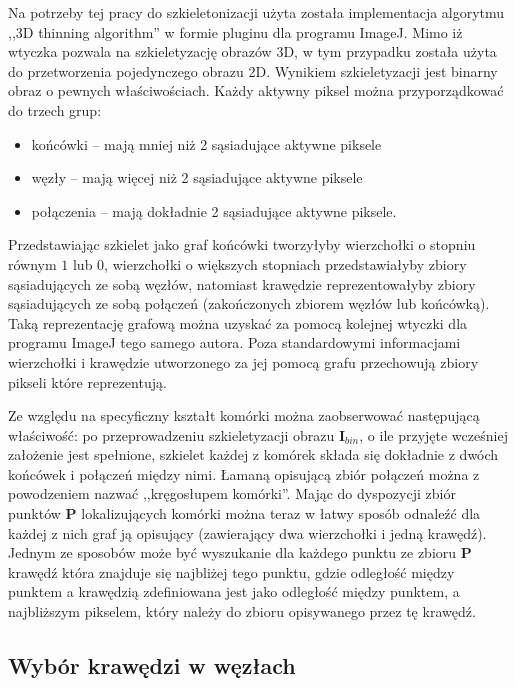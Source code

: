 \documentclass[declaration,shortabstract,mgr]{iithesis}
\newcommand{\image}{\mathbf{I}}
\begin{document}
Na potrzeby tej pracy do szkieletonizacji użyta została implementacja algorytmu ,,3D thinning algorithm''\cite{algo:3d-thinning} w formie pluginu dla programu ImageJ\cite{plugin:skeletonize-3d}. Mimo iż wtyczka pozwala na szkieletyzację obrazów 3D, w tym przypadku została użyta do przetworzenia pojedynczego obrazu 2D. Wynikiem szkieletyzacji jest binarny obraz o pewnych właściwościach. Każdy aktywny piksel można przyporządkować do trzech grup:
\begin{itemize}
  \item końcówki -- mają mniej niż 2 sąsiadujące aktywne piksele
  \item węzły -- mają więcej niż 2 sąsiadujące aktywne piksele
  \item połączenia -- mają dokładnie 2 sąsiadujące aktywne piksele.
\end{itemize}
Przedstawiając szkielet jako graf końcówki tworzyłyby wierzchołki o stopniu równym $1$ lub $0$, wierzchołki o większych stopniach przedstawiałyby zbiory sąsiadujących ze sobą węzłów, natomiast krawędzie reprezentowałyby zbiory sąsiadujących ze sobą połączeń (zakończonych zbiorem węzłów lub końcówką). Taką reprezentację grafową można uzyskać za pomocą kolejnej wtyczki dla programu ImageJ tego samego autora\cite{plugin:analyze-skeleton}. Poza standardowymi informacjami wierzchołki i krawędzie utworzonego za jej pomocą grafu przechowują zbiory pikseli które reprezentują.

Ze względu na specyficzny kształt komórki można zaobserwować następującą właściwość: po przeprowadzeniu szkieletyzacji obrazu $\image_{bin}$, o ile przyjęte wcześniej założenie jest spełnione, szkielet każdej z komórek składa się dokładnie z dwóch końcówek i połączeń między nimi. Łamaną opisującą zbiór połączeń można z powodzeniem nazwać ,,kręgosłupem komórki''. Mając do dyspozycji zbiór punktów $\mathbf{P}$ lokalizujących komórki można teraz w łatwy sposób odnaleźć dla każdej z nich graf ją opisujący (zawierający dwa wierzchołki i jedną krawędź). Jednym ze sposobów może być wyszukanie dla każdego punktu ze zbioru $\mathbf{P}$ krawędź która znajduje się najbliżej tego punktu, gdzie odległość między punktem a krawędzią zdefiniowana jest jako odległość między punktem, a najbliższym pikselem, który należy do zbioru opisywanego przez tę krawędź.

\subsection{Wybór krawędzi w węzłach}
\label{sec:spine-extending}
\end{document}
